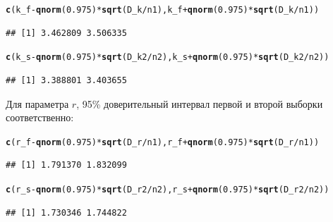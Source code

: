 \documentclass{article}\usepackage[]{graphicx}\usepackage[]{color}
\makeatletter
\newcommand{\hlnum}[1]{\textcolor[rgb]{0.686,0.059,0.569}{#1}}%
\newcommand{\hlopt}[1]{\textcolor[rgb]{0,0,0}{#1}}%
\newcommand{\hlstd}[1]{\textcolor[rgb]{0.345,0.345,0.345}{#1}}%
\newcommand{\hlkwd}[1]{\textcolor[rgb]{0.737,0.353,0.396}{\textbf{#1}}}%
\newenvironment{kframe}{%
 \def\at@end@of@kframe{}%
 \ifinner\ifhmode%
  \def\at@end@of@kframe{\end{minipage}}%
  \begin{minipage}{\columnwidth}%
 \fi\fi%
 \def\FrameCommand##1{\hskip\@totalleftmargin \hskip-\fboxsep
 \colorbox{shadecolor}{##1}\hskip-\fboxsep
     \hskip-\linewidth \hskip-\@totalleftmargin \hskip\columnwidth}%
 \MakeFramed {\advance\hsize-\width
   \@totalleftmargin\z@ \linewidth\hsize
   \@setminipage}}%
 {\par\unskip\endMakeFramed%
 \at@end@of@kframe}
\newenvironment{knitrout}{}{} %
\makeatother
\begin{document}
\begin{knitrout}
\color{fgcolor}\begin{kframe}
\begin{alltt}
\hlkwd{c}\hlstd{(k_f} \hlopt{-} \hlkwd{qnorm}\hlstd{(}\hlnum{0.975}\hlstd{)}\hlopt{*}\hlkwd{sqrt}\hlstd{(D_k} \hlopt{/} \hlstd{n1), k_f} \hlopt{+} \hlkwd{qnorm}\hlstd{(}\hlnum{0.975}\hlstd{)}\hlopt{*}\hlkwd{sqrt}\hlstd{(D_k} \hlopt{/} \hlstd{n1))}
\end{alltt}
\begin{verbatim}
## [1] 3.462809 3.506335
\end{verbatim}
\begin{alltt}
\hlkwd{c}\hlstd{(k_s} \hlopt{-} \hlkwd{qnorm}\hlstd{(}\hlnum{0.975}\hlstd{)}\hlopt{*}\hlkwd{sqrt}\hlstd{(D_k2} \hlopt{/} \hlstd{n2), k_s} \hlopt{+} \hlkwd{qnorm}\hlstd{(}\hlnum{0.975}\hlstd{)}\hlopt{*}\hlkwd{sqrt}\hlstd{(D_k2} \hlopt{/} \hlstd{n2))}
\end{alltt}
\begin{verbatim}
## [1] 3.388801 3.403655
\end{verbatim}
\end{kframe}
\end{knitrout}

Для параметра $r$, 95\% доверительный интервал первой и второй выборки соответственно:

\begin{knitrout}
\color{fgcolor}\begin{kframe}
\begin{alltt}
\hlkwd{c}\hlstd{(r_f} \hlopt{-} \hlkwd{qnorm}\hlstd{(}\hlnum{0.975}\hlstd{)}\hlopt{*}\hlkwd{sqrt}\hlstd{(D_r} \hlopt{/} \hlstd{n1), r_f} \hlopt{+} \hlkwd{qnorm}\hlstd{(}\hlnum{0.975}\hlstd{)}\hlopt{*}\hlkwd{sqrt}\hlstd{(D_r} \hlopt{/} \hlstd{n1))}
\end{alltt}
\begin{verbatim}
## [1] 1.791370 1.832099
\end{verbatim}
\begin{alltt}
\hlkwd{c}\hlstd{(r_s} \hlopt{-} \hlkwd{qnorm}\hlstd{(}\hlnum{0.975}\hlstd{)}\hlopt{*}\hlkwd{sqrt}\hlstd{(D_r2} \hlopt{/} \hlstd{n2), r_s} \hlopt{+} \hlkwd{qnorm}\hlstd{(}\hlnum{0.975}\hlstd{)}\hlopt{*}\hlkwd{sqrt}\hlstd{(D_r2} \hlopt{/} \hlstd{n2))}
\end{alltt}
\begin{verbatim}
## [1] 1.730346 1.744822
\end{verbatim}
\end{kframe}
\end{knitrout}
\end{document}
